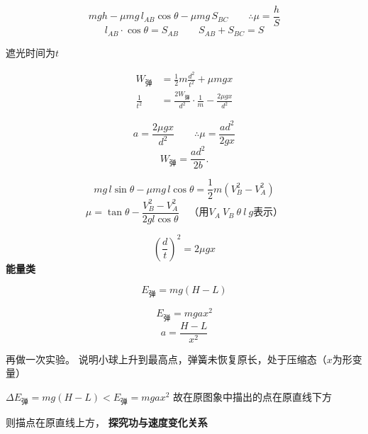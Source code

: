 \[mgh-\mu mg\,l_{AB}\cos\theta-\mu mg\,S_{BC}\qquad\therefore\mu=\frac{h}{S}\] %
\[l_{AB}\cdot\cos\theta=S_{AB}\qquad S_{AB}+S_{BC}=S\]

遮光时间为$t$

\begin{align*}
W_{\text{弹}}&=\frac{1}{2}m\frac{d^2}{t^2}+\mu mgx\\
\frac{1}{t^2}&=\frac{2W_{\text{弹}}}{d^2}\cdot\frac{1}{m}-\frac{2\mu gx}{d^2}
\end{align*}


\[a=\frac{2\mu gx}{d^2}\qquad\therefore\mu=\frac{ad^2}{2gx}\]
\[W_{\text{弹}}=\frac{ad^2}{2b}.\]

\[mg\,l\sin\theta-\mu mg\,l\cos\theta=\frac{1}{2}m\left(V_B^2-V_A^2\right)\]
\[\mu=\tan\theta-\frac{V_B^2-V_A^2}{2gl\cos\theta}\quad\text{（用}V_A\ V_B\ \theta\ l\ g\text{表示）}\]

\[\left(\frac{d}{t}\right)^2=2\mu gx\]
\textbf{能量类}


\[ E_{\text{弹}}=mg(H-L) \]


\[ E_{\text{弹}}=mgax^2 \]
\[ a=\frac{H-L}{x^2} \]

再做一次实验。 说明小球上升到最高点，弹簧未恢复原长，处于压缩态（$x$为形变量）

$\Delta E_{\text{弹}}=mg(H-L)<E_{\text{弹}}=mgax^2$ 故在原图象中描出的点在原直线下方 %

 则描点在原直线上方，
\textbf{探究功与速度变化关系}

